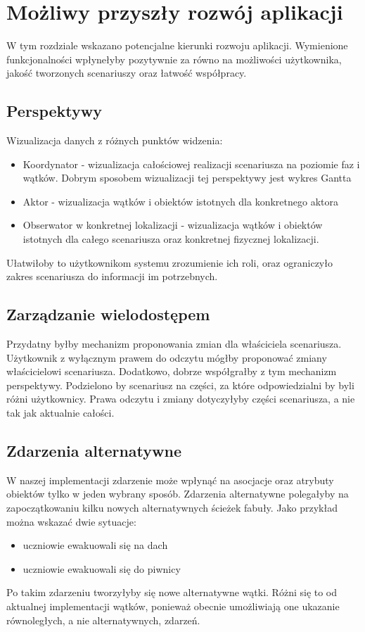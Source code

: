\chapter{Możliwy przyszły rozwój aplikacji}

W tym rozdziale wskazano potencjalne kierunki rozwoju aplikacji. Wymienione funkcjonalności wpłynełyby pozytywnie za równo na
możliwości użytkownika, jakość tworzonych scenariuszy oraz łatwość współpracy.

\section{Perspektywy}

Wizualizacja danych z różnych punktów widzenia:
\begin{itemize}
    \item Koordynator - wizualizacja całościowej realizacji scenariusza na poziomie faz i wątków. Dobrym sposobem wizualizacji tej
    perspektywy jest wykres Gantta
    \item Aktor - wizualizacja wątków i obiektów istotnych dla konkretnego aktora
    \item Obserwator w konkretnej lokalizacji - wizualizacja wątków i obiektów istotnych dla całego scenariusza oraz konkretnej fizycznej lokalizacji.
\end{itemize}

Ułatwiłoby to użytkownikom systemu zrozumienie ich roli, oraz ograniczyło zakres scenariusza do informacji im potrzebnych.

\section{Zarządzanie wielodostępem}

Przydatny byłby mechanizm proponowania zmian dla właściciela scenariusza. Użytkownik z wyłącznym prawem do odczytu mógłby proponować 
zmiany właścicielowi scenariusza. Dodatkowo, dobrze współgrałby z tym mechanizm perspektywy. Podzielono by scenariusz na części, 
za które odpowiedzialni by byli różni użytkownicy. Prawa odczytu i zmiany dotyczyłyby części scenariusza, a nie tak jak aktualnie 
całości.

\section{Zdarzenia alternatywne}

W naszej implementacji zdarzenie 
może wpłynąć na asocjacje oraz atrybuty obiektów tylko w jeden wybrany sposób. Zdarzenia alternatywne polegałyby na 
zapoczątkowaniu kilku nowych alternatywnych ścieżek fabuły. 
\noindent Jako przykład można wskazać dwie sytuacje:
\begin{itemize}
    \item uczniowie ewakuowali się na dach
    \item uczniowie ewakuowali się do piwnicy 
\end{itemize}
\noindent Po takim zdarzeniu tworzyłyby się nowe alternatywne wątki. Różni się to od aktualnej implementacji wątków, 
ponieważ obecnie umożliwiają one ukazanie równoległych, a nie alternatywnych, zdarzeń.

